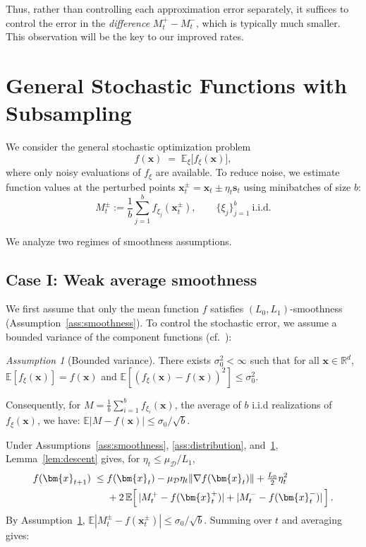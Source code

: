 \documentclass[twoside]{article}
\theoremstyle{plain}
\theoremstyle{definition}
\theoremstyle{remark}
\newtheorem{assumption}{Assumption}
\def\vs{{\bm{s}}}
\def\vx{{\bm{x}}}
\newcommand{\E}{\mathbb{E}}
\newcommand{\R}{\mathbb{R}}
\begin{document}
Thus, rather than controlling each approximation error separately, it suffices 
to control the error in the \emph{difference} $M_t^+ - M_t^-$, which is typically 
much smaller. This observation will be the key to our improved rates.
\section{General Stochastic Functions with Subsampling} \label{sec:stochastic-subsampling}

We consider the general stochastic optimization problem
\[
    f(\vx) \;=\; \E_{\xi}\big[f_\xi(\vx)\big],
\]
where only noisy evaluations of $f_\xi$ are available. To reduce noise, we
estimate function values at the perturbed points
$\vx_t^\pm = \vx_t \pm \eta_t \vs_t$ using minibatches of size $b$:
\[
   M_t^\pm := \frac{1}{b} \sum_{j=1}^b f_{\xi_j}(\vx_t^\pm),
   \qquad \{\xi_j\}_{j=1}^b \ \text{i.i.d.}
\]

We analyze two regimes of smoothness assumptions.

\subsection{Case I: Weak average smoothness}

We first assume that only the mean function $f$ satisfies
$(L_0,L_1)$-smoothness (Assumption~\ref{ass:smoothness}). To control the
stochastic error, we assume a bounded variance of the component functions
(cf.~\cite{boucherouite2024mistp}):
\begin{assumption}[Bounded variance]
\label{ass:variance}
There exists $\sigma_0^2<\infty$ such that for all $\vx\in\R^d$, $\E[f_\xi(\vx)] = f(\vx)$ and
\(
   \E[\left(f_\xi(\vx) - f(\vx)\right)^2] \le \sigma_0^2.
\)
\end{assumption}

Consequently, for $M = \frac{1}{b}\sum_{i=1}^b f_{\xi_i}(\vx)$, the average of $b$ i.i.d realizations of $f_{\xi}(\vx)$, we have:  $\E|M - f(\vx)| \le \sigma_0/\sqrt{b}$.

Under Assumptions~\ref{ass:smoothness}, \ref{ass:distribution},
and~\ref{ass:variance}, Lemma~\ref{lem:descent} gives, for
$\eta_t\le \mu_{\mathcal{D}}/L_1$,
\begin{align}
    f(\vx_{t+1}) \;\le\;& f(\vx_t) 
    - \mu_{\mathcal{D}} \eta_t \|\nabla f(\vx_t)\|
    + \tfrac{L_0}{2}\eta_t^2 \notag \\
    &+ 2\,\E\!\left[\, 
        |M_t^+ - f(\vx_t^+)| 
        + |M_t^- - f(\vx_t^-)| 
    \,\right].
\end{align}
By Assumption~\ref{ass:variance}, $\E|M_t^\pm - f(\vx_t^\pm)| \le
\sigma_0/\sqrt{b}$. Summing over $t$ and averaging gives:
\end{document}
